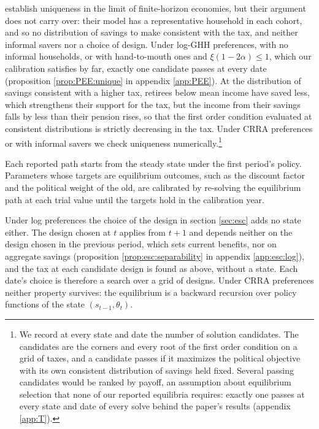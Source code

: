 \textcite{mkvss08} establish uniqueness in the limit of finite-horizon economies, but their argument does not carry over: their model has a representative household in each cohort, and so no distribution of savings to make consistent with the tax, and neither informal savers nor a choice of design. Under log-GHH preferences, with no informal households, or with hand-to-mouth ones and $\xi(1-2\alpha) \leq 1$, which our calibration satisfies by far, exactly one candidate passes at every date (proposition \ref{prop:PEE:unique} in appendix \ref{app:PEE}). At the distribution of savings consistent with a higher tax, retirees below mean income have saved less, which strengthens their support for the tax, but the income from their savings falls by less than their pension rises, so that the first order condition evaluated at consistent distributions is strictly decreasing in the tax. Under CRRA preferences or with informal savers we check uniqueness numerically.\footnote{We record at every state and date the number of solution candidates. The candidates are the corners and every root of the first order condition on a grid of taxes, and a candidate passes if it maximizes the political objective with its own consistent distribution of savings held fixed. Several passing candidates would be ranked by payoff, an assumption about equilibrium selection that none of our reported equilibria requires: exactly one passes at every state and date of every solve behind the paper's results (appendix \ref{app:T}).}

Each reported path starts from the steady state under the first period's policy. Parameters whose targets are equilibrium outcomes, such as the discount factor and the political weight of the old, are calibrated by re-solving the equilibrium path at each trial value until the targets hold in the calibration year.

Under log preferences the choice of the design in section \ref{sec:esc} adds no state either. The design chosen at $t$ applies from $t+1$ and depends neither on the design chosen in the previous period, which sets current benefits, nor on aggregate savings (proposition \ref{prop:esc:separability} in appendix \ref{app:esc:log}), and the tax at each candidate design is found as above, without a state. Each date's choice is therefore a search over a grid of designs. Under CRRA preferences neither property survives: the equilibrium is a backward recursion over policy functions of the state $(s_{t-1},\theta_t)$. 
